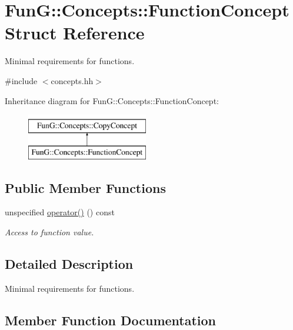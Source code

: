 \hypertarget{structFunG_1_1Concepts_1_1FunctionConcept}{}\section{Fun\+G\+:\+:Concepts\+:\+:Function\+Concept Struct Reference}
\label{structFunG_1_1Concepts_1_1FunctionConcept}


Minimal requirements for functions.  




{\ttfamily \#include $<$concepts.\+hh$>$}

Inheritance diagram for Fun\+G\+:\+:Concepts\+:\+:Function\+Concept\+:\begin{figure}[H]
\begin{center}
\leavevmode
\includegraphics[height=2.000000cm]{structFunG_1_1Concepts_1_1FunctionConcept}
\end{center}
\end{figure}
\subsection*{Public Member Functions}
\begin{DoxyCompactItemize}
\item 
unspecified \hyperlink{structFunG_1_1Concepts_1_1FunctionConcept_ae09a34291f803c3139038e944a4e399d}{operator()} () const 
\begin{DoxyCompactList}\small\item\em Access to function value. \end{DoxyCompactList}\end{DoxyCompactItemize}


\subsection{Detailed Description}
Minimal requirements for functions. 

\subsection{Member Function Documentation}
\hypertarget{structFunG_1_1Concepts_1_1FunctionConcept_ae09a34291f803c3139038e944a4e399d}{}

